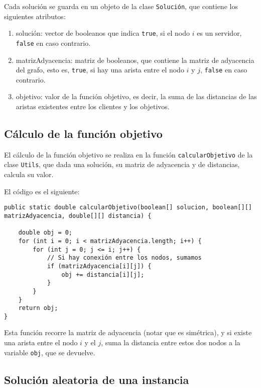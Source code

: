 \documentclass[11pt,a4paper,twoside,openright,titlepage,final]{article}
\begin{document}
Cada solución se guarda en un objeto de la clase \texttt{Solución}, que contiene los siguientes atributos:

\begin{enumerate}
	\item solución: vector de booleanos que indica \texttt{true}, si el nodo $i$ es un servidor, \texttt{false} en caso contrario.
	\item matrizAdyacencia: matriz de booleanos, que contiene la matriz de adyacencia del grafo, esto es, \texttt{true}, si hay una arista entre el nodo $i$ y $j$, \texttt{false} en caso contrario.
	\item objetivo: valor de la función objetivo, es decir, la suma de las distancias de las aristas existentes entre los clientes y los objetivos. 
\end{enumerate}

\subsection{Cálculo de la función objetivo}

El cálculo de la función objetivo se realiza en la función \texttt{calcularObjetivo} de la clase \texttt{Utils}, que dada una solución, su matriz de adyacencia y de distancias, calcula su valor.

El código es el siguiente:

\begin{verbatim}
public static double calcularObjetivo(boolean[] solucion, boolean[][] matrizAdyacencia, double[][] distancia) {

    double obj = 0;
    for (int i = 0; i < matrizAdyacencia.length; i++) {
        for (int j = 0; j <= i; j++) {
            // Si hay conexión entre los nodos, sumamos
            if (matrizAdyacencia[i][j]) {
                obj += distancia[i][j];
            }
        }
    }
    return obj;
}
\end{verbatim}

Esta función recorre la matriz de adyacencia (notar que es simétrica), y si existe una arista entre el nodo $i$ y el $j$, suma la distancia entre estos dos nodos a la variable \texttt{obj}, que se devuelve.

\subsection{Solución aleatoria de una instancia}
\end{document}
